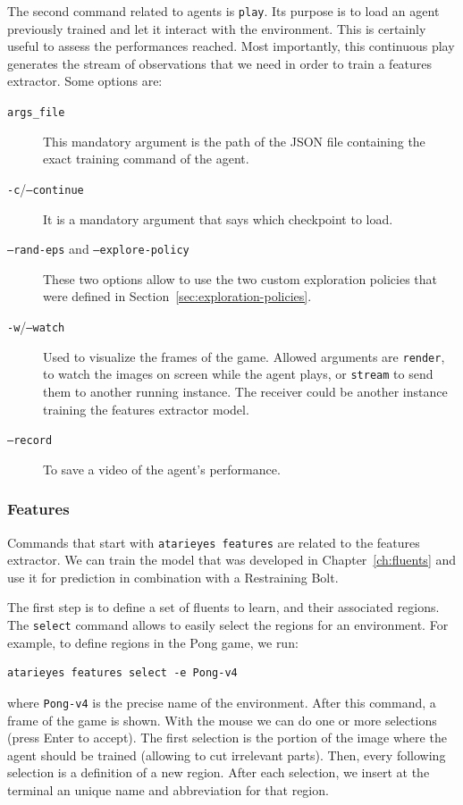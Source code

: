 The second command related to agents is \texttt{play}. Its purpose is to load
an agent previously trained and let it interact with the environment. This is
certainly useful to assess the performances reached. Most importantly, this
continuous play generates the stream of observations that we need in order to
train a features extractor. Some options are:
\begin{description}
	\item [\texttt{args\_file}] This mandatory argument is the path of the JSON
		file containing the exact training command of the agent.
	\item [\texttt{-c}/\texttt{--continue}] It is a mandatory argument that
		says which checkpoint to load.
	\item [\texttt{--rand-eps} {\normalfont and} \texttt{--explore-policy}]
		These two options allow to use the two custom exploration policies that
		were defined in Section~\ref{sec:exploration-policies}.
	\item [\texttt{-w}/\texttt{--watch}] Used to visualize the frames of the
		game.  Allowed arguments are \texttt{render}, to watch the images on
		screen while the agent plays, or \texttt{stream} to send them to another
		running instance. The receiver could be another instance training the
		features extractor model.
	\item [\texttt{--record}] To save a video of the agent's performance.
\end{description}


\subsubsection*{Features}

Commands that start with \texttt{atarieyes features} are related to the
features extractor. We can train the model that was developed in
Chapter~\ref{ch:fluents} and use it for prediction in combination with a
Restraining Bolt.

The first step is to define a set of fluents to learn, and their associated
regions. The \texttt{select} command allows to easily select the regions for
an environment. For example, to define regions in the Pong game, we run:
\begin{verbatim}
atarieyes features select -e Pong-v4
\end{verbatim}
where \texttt{Pong-v4} is the precise name of the environment. After this
command, a frame of the game is shown. With the mouse we can do one or more
selections (press Enter to accept). The first selection is the portion of the
image where the agent should be trained (allowing to cut irrelevant parts).
Then, every following selection is a definition of a new region. After each
selection, we insert at the terminal an unique name and abbreviation for that
region.

